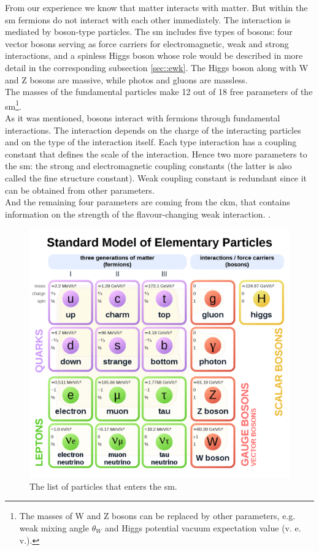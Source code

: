 	From our experience we know that matter interacts with matter. But within the \gls{sm} fermions do not interact with each other immediately. The interaction is mediated by boson-type particles. The \gls{sm} includes five types of bosons: four vector bosons serving as force carriers for electromagnetic, weak and strong interactions, and a spinless Higgs boson whose role would be described in more detail in the corresponding subsection \ref{sec::ewk}. The Higgs boson along with W and Z bosons are massive, while photos and gluons are massless.\\
	The masses of the fundamental particles make 12 out of 18 free parameters of the \gls{sm}\footnote{The masses of W and Z bosons can be replaced by other parameters, e.g. weak mixing angle $\theta_W$ and Higgs potential vacuum expectation value (v. e. v.).}. \\
	As it was mentioned, bosons interact with fermions through fundamental interactions. The interaction depends on the charge of the interacting particles and on the type of the interaction itself. Each type interaction has a coupling constant that defines the scale of the interaction. Hence two more parameters to the \gls{sm}: the strong and electromagnetic coupling constants (the latter is also called the fine structure constant). Weak coupling constant is redundant since it can be obtained from other parameters.\\
	And the remaining four parameters are coming from the \gls{ckm}, that contains information on the strength of the flavour-changing weak interaction. \cite{PhysRevD.86.010001}. 
	
	 \begin{figure}[htpb]
		\includegraphics[width=\textwidth,keepaspectratio]{SMwiki.png}
		\caption{The list of particles that enters the \gls{sm}\cite{sm_wiki}. }
		\label{fig::SMwiki}
	\end{figure}
		
